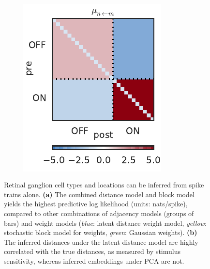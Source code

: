 \begin{figure}[t!]
\begin{subfigure}[b]{1.85in}
    \label{fig:rgc_rho}
  \end{subfigure}
  ~
  \begin{subfigure}[b]{1.85in}
    \centering
    \caption{}
    \vspace{-.2in}
    \includegraphics[width=\textwidth]{figures/ch3/rgc_mean_conn.pdf}
    \label{fig:rgc_mu}
  \end{subfigure}
  \vspace{-2em}
  \caption[Retinal ganglion cell types and locations inferred
    from spike trains alone]
          {Retinal ganglion cell types and locations can be inferred
    from spike trains alone.
    \textbf{(a)} The combined distance model and block model yields the highest predictive log likelihood (units: nats/spike), compared to other combinations of adjacency models (groups of bars) and weight models (\textit{blue}: latent distance weight model, \textit{yellow}: stochastic block model for weights, \textit{green}: Gaussian weights).
    \textbf{(b)} The inferred distances under the latent distance model are highly correlated with the true distances, as measured by stimulus sensitivity, whereas inferred embeddings under PCA are not.
}
\end{figure}
